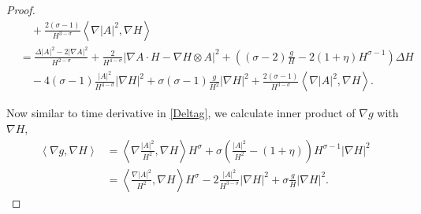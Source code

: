 \begin{proof}
\begin{align*}
        & \quad + \frac{2(\sigma -1)}{H^{3-\sigma}} \left< \nabla |A|^{2}, \nabla H \right>  \\
        & = \frac{\Delta |A|^{2}- 2|\nabla A|^{2}}{H^{2-\sigma}} + \frac{2}{H^{4-\sigma}}| \nabla A \cdot H - \nabla H \otimes A|^{2} + \left( (\sigma-2)\frac{g}{H} - 2(1+\eta)H^{\sigma-1} \right)\Delta H \\
        & \quad - 4(\sigma -1) \frac{|A|^{2}}{H^{4-\sigma}} |\nabla H|^{2} + \sigma(\sigma -1)\frac{g}{H^{2}}|\nabla H|^{2}+ \frac{2(\sigma -1)}{H^{3-\sigma}} \left< \nabla |A|^{2}, \nabla H \right>.
    \end{align*}

    Now similar to time derivative in \cref{Deltag}, we calculate inner product of $ \nabla g $ with $ \nabla H $, \begin{align*}
        \left< \nabla g, \nabla H \right> & = \left< \nabla\frac{ |A|^{2}}{H^{2}}, \nabla H \right>H^{\sigma} + \sigma\left( \frac{|A|^{2}}{H^{2}} - (1+ \eta) \right) H^{\sigma-1}| \nabla H|^{2} \\
        & = \left< \frac{\nabla |A|^{2}}{H^{2}}, \nabla H \right>H^{\sigma} -2 \frac{|A|^{2}}{H^{3-\sigma}}|\nabla H|^{2}+ \sigma \frac{g}{H}| \nabla H|^{2}.
    \end{align*}


\end{proof}
